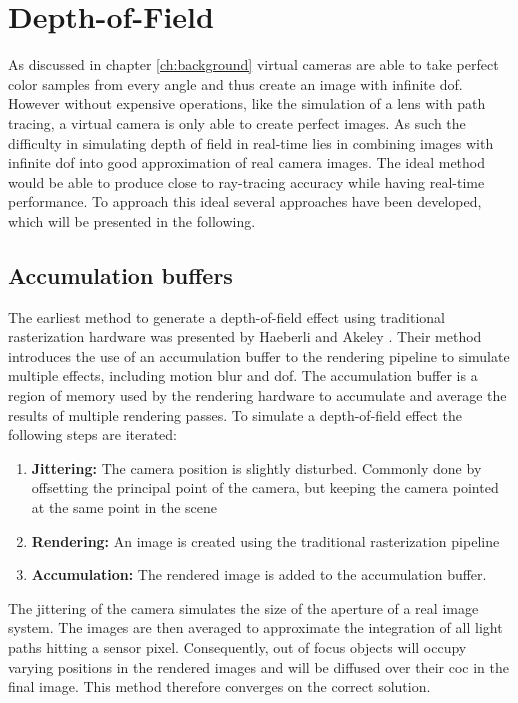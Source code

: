 \chapter{Depth-of-Field}
As discussed in chapter \ref{ch:background} virtual cameras are able to take perfect color samples from every angle and thus create an image with infinite \gls{dof}.
However without expensive operations, like the simulation of a lens with path tracing, a virtual camera is only able to create perfect images.
As such the difficulty in simulating depth of field in real-time lies in combining images with infinite \gls{dof} into good approximation of real camera images.
The ideal method would be able to produce close to ray-tracing accuracy while having real-time performance.
To approach this ideal several approaches have been developed, which will be presented in the following.

\section{Accumulation buffers}
The earliest method to generate a depth-of-field effect using traditional rasterization hardware was presented by Haeberli and Akeley \cite{Haeberli.1990}.
Their method introduces the use of an accumulation buffer to the rendering pipeline to simulate multiple effects, including motion blur and \gls{dof}.
The accumulation buffer is a region of memory used by the rendering hardware to accumulate and average the results of multiple rendering passes.
To simulate a depth-of-field effect the following steps are iterated:
\begin{enumerate}
    \item \textbf{Jittering:} The camera position is slightly disturbed. Commonly done by offsetting the principal point of the camera, but keeping the camera pointed at the same point in the scene
    \item \textbf{Rendering:} An image is created using the traditional rasterization pipeline
    \item \textbf{Accumulation:} The rendered image is added to the accumulation buffer.
\end{enumerate}
The jittering of the camera simulates the size of the aperture of a real image system.
The images are then averaged to approximate the integration of all light paths hitting a sensor pixel.
Consequently, out of focus objects will occupy varying positions in the rendered images and will be diffused over their \gls{coc} in the final image.
This method therefore converges on the correct solution.

